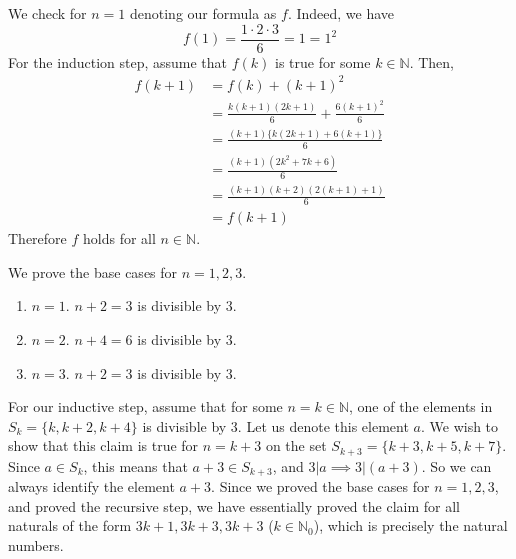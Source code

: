   \begin{exercise}
    We check for $n = 1$ denoting our formula as $f$. Indeed, we have 
    \begin{equation}
      f(1) = \frac{1 \cdot 2 \cdot 3}{6} = 1 = 1^2
    \end{equation} 
    For the induction step, assume that $f(k)$ is true for some $k \in \mathbb{N}$. Then, 
    \begin{align}
      f(k+1) & = f(k) + (k+1)^2 \\
             & = \frac{k (k + 1) (2k + 1)}{6} + \frac{6 (k+1)^2}{6} \\
             & = \frac{(k+1) \{ k (2k+1) + 6(k+1)\}}{6} \\
             & = \frac{(k+1) (2k^2 + 7k + 6)}{6} \\
             & = \frac{(k+1)(k+2)(2(k+1) + 1)}{6} \\
             & = f(k+1)
    \end{align}
    Therefore $f$ holds for all $n \in \mathbb{N}$. 
  \end{exercise} 

  \begin{exercise}
    We prove the base cases for $n = 1, 2, 3$. 
    \begin{enumerate}
      \item $n = 1$. $n+2 = 3$ is divisible by $3$. 
      \item $n = 2$. $n+4 = 6$ is divisible by $3$. 
      \item $n = 3$. $n+2 = 3$ is divisible by $3$. 
    \end{enumerate} 
    For our inductive step, assume that for some $n = k \in \mathbb{N}$, one of the elements in $S_k = \{k, k+2, k+4\}$ is divisible by $3$. Let us denote this element $a$. We wish to show that this claim is true for $n = k+3$ on the set $S_{k+3} = \{k+3, k+5, k+7\}$. Since $a \in S_k$, this means that $a+3 \in S_{k+3}$, and $3 | a \implies 3 | (a+3)$. So we can always identify the element $a+3$. Since we proved the base cases for $n=1, 2, 3$, and proved the recursive step, we have essentially proved the claim for all naturals of the form $3k+1, 3k+3, 3k+3$ ($k \in \mathbb{N}_0$), which is precisely the natural numbers. 
  \end{exercise}

